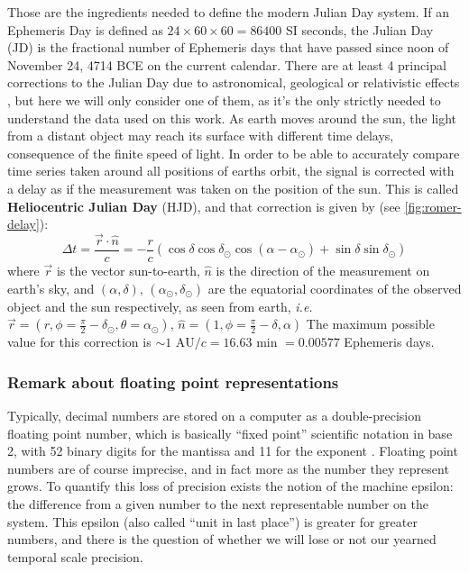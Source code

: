 	Those are the ingredients needed to define the modern Julian Day system. If an Ephemeris Day is defined as $24\times60\times60=86400$ SI seconds, 
	the Julian Day (JD) is the fractional number of Ephemeris days that have passed since noon of November 24, 4714 BCE on the current calendar. 
	There are at least 4 principal corrections to the Julian Day due to astronomical, geological or relativistic effects \citep{Eastman2010}, 
	but here we will only consider one of them, as it's the only strictly needed to understand the data used on this work.
	As earth moves around the sun, the light from a distant object may reach its surface with different time delays, consequence of the finite speed of light.
	In order to be able to accurately compare time series taken around all positions of earths orbit, 
	the signal is corrected with a delay as if the measurement was taken on the position of the sun.
	This is called \textbf{Heliocentric Julian Day} (HJD), and that correction is given by (see \autoref{fig:romer-delay}):
	\begin{equation}
		\Delta t = \frac{\vec{r}\cdot \hat{n}}{c} = - \frac{r}{c} \left(\cos\delta \cos \delta_{\odot}\cos(\alpha-\alpha_\odot)+ \sin\delta \sin \delta_\odot\right)
	\end{equation}
	where $\vec{r}$ is the vector sun-to-earth, $\hat{n}$ is the direction of the measurement on earth's sky, 
	and $(\alpha,\delta),\,(\alpha_\odot,\delta_\odot)$ are the equatorial coordinates of the observed object and the sun respectively, 
	as seen from earth, \textit{i.e.} $\vec{r} = (r,\phi=\frac\pi2-\delta_\odot,\theta=\alpha_\odot)$, $\hat n = (1,\phi=\frac\pi2-\delta,\alpha)$ 
	The maximum possible value for this correction is $\sim 1 \text{ AU}/c = 16.63 \text{ min } = 0.00577$ Ephemeris days.
	
	
	
	
	\subsubsection{Remark about floating point representations}
	
	
	Typically, decimal numbers are stored on a computer as a double-precision floating point number, 
	which is basically \enquote{fixed point} scientific notation in base 2, with 52 binary digits for the mantissa and 11 for the exponent \citep{IEEE2019}.
	Floating point numbers are of course imprecise, and in fact more as the number they represent grows. 
	To quantify this loss of precision exists the notion of the machine epsilon: 
	the difference from a given number to the next representable number on the system.
	This epsilon (also called \enquote{unit in last place}) is greater for greater numbers,
	and there is the question of whether we will lose or not our yearned temporal scale precision.
	
